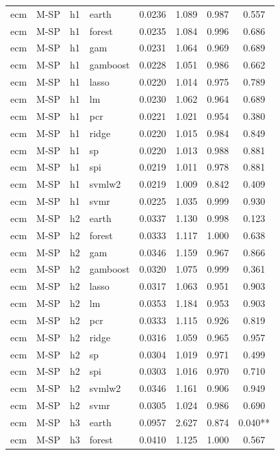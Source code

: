 \begin{ThreePartTable}
\begin{longtable}[t]{llclcccc}
\addlinespace
ecm & M-SP & h1 & earth & 0.0236 & 1.089 & 0.987 & 0.557\\
ecm & M-SP & h1 & forest & 0.0235 & 1.084 & 0.996 & 0.686\\
ecm & M-SP & h1 & gam & 0.0231 & 1.064 & 0.969 & 0.689\\
ecm & M-SP & h1 & gamboost & 0.0228 & 1.051 & 0.986 & 0.662\\
ecm & M-SP & h1 & lasso & 0.0220 & 1.014 & 0.975 & 0.789\\
ecm & M-SP & h1 & lm & 0.0230 & 1.062 & 0.964 & 0.689\\
ecm & M-SP & h1 & pcr & 0.0221 & 1.021 & 0.954 & 0.380\\
ecm & M-SP & h1 & ridge & 0.0220 & 1.015 & 0.984 & 0.849\\
ecm & M-SP & h1 & sp & 0.0220 & 1.013 & 0.988 & 0.881\\
ecm & M-SP & h1 & spi & 0.0219 & 1.011 & 0.978 & 0.881\\
ecm & M-SP & h1 & svmlw2 & 0.0219 & 1.009 & 0.842 & 0.409\\
ecm & M-SP & h1 & svmr & 0.0225 & 1.035 & 0.999 & 0.930\\
\addlinespace
ecm & M-SP & h2 & earth & 0.0337 & 1.130 & 0.998 & 0.123\\
ecm & M-SP & h2 & forest & 0.0333 & 1.117 & 1.000 & 0.638\\
ecm & M-SP & h2 & gam & 0.0346 & 1.159 & 0.967 & 0.866\\
ecm & M-SP & h2 & gamboost & 0.0320 & 1.075 & 0.999 & 0.361\\
ecm & M-SP & h2 & lasso & 0.0317 & 1.063 & 0.951 & 0.903\\
ecm & M-SP & h2 & lm & 0.0353 & 1.184 & 0.953 & 0.903\\
ecm & M-SP & h2 & pcr & 0.0333 & 1.115 & 0.926 & 0.819\\
ecm & M-SP & h2 & ridge & 0.0316 & 1.059 & 0.965 & 0.957\\
ecm & M-SP & h2 & sp & 0.0304 & 1.019 & 0.971 & 0.499\\
ecm & M-SP & h2 & spi & 0.0303 & 1.016 & 0.970 & 0.710\\
ecm & M-SP & h2 & svmlw2 & 0.0346 & 1.161 & 0.906 & 0.949\\
ecm & M-SP & h2 & svmr & 0.0305 & 1.024 & 0.986 & 0.690\\
\addlinespace
ecm & M-SP & h3 & earth & 0.0957 & 2.627 & 0.874 & 0.040**\\
ecm & M-SP & h3 & forest & 0.0410 & 1.125 & 1.000 & 0.567\\

\end{longtable}
\end{ThreePartTable}
